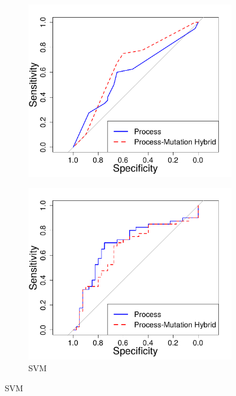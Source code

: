 \begin{figure}[H]
	\begin{subfigure}{.5\textwidth}
		\centering
		\includegraphics[width=\linewidth]{img/evaluation/phase3-roc-dt.pdf}
		\caption{}
	\end{subfigure}
	\begin{subfigure}{.5\textwidth}
		\centering
		\includegraphics[width=\linewidth]{img/evaluation/phase3-roc-svm.pdf}
		\caption{SVM}
	\end{subfigure}

\end{figure}
